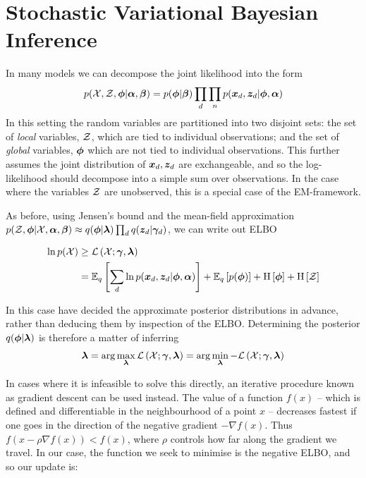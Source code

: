 \section{Stochastic Variational Bayesian Inference}
In many models we can decompose the joint likelihood into the form
\begin{align}
p({ \mathcal{X} }, { \mathcal{Z} }, { \bm \phi } | \bm \alpha,\bm \beta) = p({ \bm \phi } | \bm \beta)  \prod_d \prod_n p({ \bm x_d }, { \bm z_d } | { \bm \phi }, \bm \alpha) \label{eqn:svi-joint-likely}
\end{align}
In this setting the random variables are partitioned into two disjoint sets: the set of \emph{local} variables, ${ \mathcal{Z} }$, which are tied to individual observations; and the set of \emph{global} variables, $\bm \phi$ which are not tied to individual observations. This further assumes the joint distribution of ${ \bm x_d }, { \bm z_d }$ are exchangeable, and so the log-likelihood should decompose into a simple sum over observations. In the case where the variables ${ \mathcal{Z} }$ are unobserved, this is a special case of the EM-framework.

\newcommand \varparam { { \vv{\lambda} } }
\newcommand \elbo { { \mathcal{L}\left(\xdat; \vv{\gamma}, \varparam \right)  } }
\newcommand \elbot[1] { { \mathcal{L}\left(\xdat; \vv{\gamma}, \varparam^{{#1}} \right)  } }



As before, using Jensen's bound and the mean-field approximation $p(\zdat, \param | \xdat, \vv{\alpha},\vv{\beta}) \approx q(\param | \varparam)\prod_d q(\zd|\vv{\gamma}_d)$, we can write out ELBO

\begin{align}
\ln p(\xdat) 
& \geq \elbo \\
& = \ex{\sum_d \ln p(\xd, \zd | \param, \vv{\alpha})}{q} + \ex{p(\param)}{q} + \ent{\param} + \ent{\zdat}
\end{align}

In this case have decided the approximate posterior distributions in advance, rather than deducing them by inspection of the ELBO. Determining the posterior $q(\param|\varparam)$ is therefore a matter of inferring
\begin{align}
\varparam = \arg \max_\varparam \elbo = \arg \min_\varparam -\elbo
\end{align}

In cases where it is infeasible to solve this directly, an iterative procedure known as gradient descent can be used instead. The value of a function $f(x)$ -- which is defined and differentiable in the neighbourhood of a point $x$ -- decreases fastest if one goes in the direction of the negative gradient $-\nabla f(x)$. Thus $f(x - \rho \nabla f(x)) < f(x)$, where $\rho$ controls how far along the gradient we travel. In our case, the function we seek to minimise is the negative ELBO, and so our update is:

